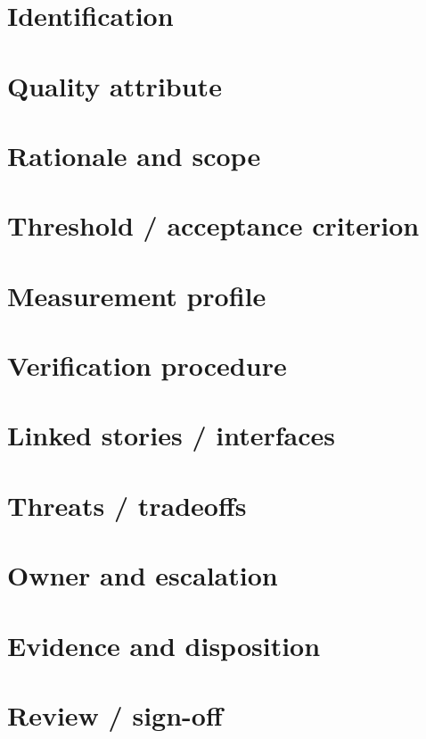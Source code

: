 \documentclass[11pt,letterpaper]{article}
\begin{document}
\section{Identification}
\section{Quality attribute}
\section{Rationale and scope}
\section{Threshold / acceptance criterion}
\section{Measurement profile}
\section{Verification procedure}
\clearpage
\section{Linked stories / interfaces}
\section{Threats / tradeoffs}
\section{Owner and escalation}
\section{Evidence and disposition}
\clearpage
\section{Review / sign-off}
\end{document}
